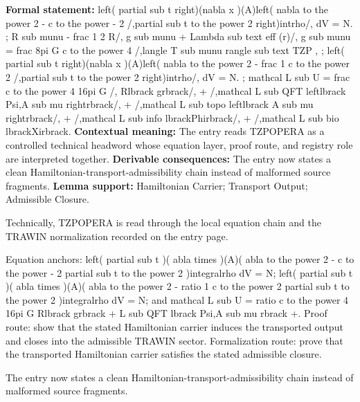 \begingroup\footnotesize\setlength{\emergencystretch}{3em}\sloppy
\textbf{Formal statement:} left( partial sub t right)(nabla x )(A)left( nabla to the power 2 - c to the power - 2 /,partial sub t to the power 2 right)intrho/, dV = N. ; R sub munu - frac 1 2 R/, g sub munu + Lambda sub text eff (r)/, g sub munu = frac 8pi G c to the power 4 /,langle T sub munu rangle sub text TZP , ; left( partial sub t right)(nabla x )(A)left( nabla to the power 2 - frac 1 c to the power 2 /,partial sub t to the power 2 right)intrho/, dV = N. ; mathcal L sub U = frac c to the power 4 16pi G /, Rlbrack grbrack/, + /,mathcal L sub QFT leftlbrack Psi,A sub mu rightrbrack/, + /,mathcal L sub topo leftlbrack A sub mu rightrbrack/, + /,mathcal L sub info lbrackPhirbrack/, + /,mathcal L sub bio lbrackXirbrack. \textbf{Contextual meaning:} The entry reads TZPOPERA as a controlled technical headword whose equation layer, proof route, and registry role are interpreted together. \textbf{Derivable consequences:} The entry now states a clean Hamiltonian-transport-admissibility chain instead of malformed source fragments. \textbf{Lemma support:} Hamiltonian Carrier; Transport Output; Admissible Closure.\par
\endgroup

Technically, TZPOPERA is read through the local equation chain and the TRAWIN normalization recorded on the entry page.

Equation anchors: left( partial sub t )( abla times )(A)( abla to the power 2 - c to the power - 2 partial sub t to the power 2 )integralrho dV = N; left( partial sub t )( abla times )(A)( abla to the power 2 - ratio 1 c to the power 2 partial sub t to the power 2 )integralrho dV = N; and mathcal L sub U = ratio c to the power 4 16pi G Rlbrack grbrack + L sub QFT lbrack Psi,A sub mu rbrack +. Proof route: show that the stated Hamiltonian carrier induces the transported output and closes into the admissible TRAWIN sector. Formalization route: prove that the transported Hamiltonian carrier satisfies the stated admissible closure.

The entry now states a clean Hamiltonian-transport-admissibility chain instead of malformed source fragments.
\endgroup

